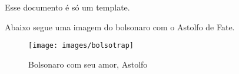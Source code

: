 \documentclass[../resumo.tex]{subfiles}
\begin{document}
	Esse documento é só um template.

	Abaixo segue uma imagem do bolsonaro com o Astolfo de Fate.

	\begin{figure}[H]
		\centering
		\texttt{[image: images/bolsotrap]}
		\caption{Bolsonaro com seu amor, Astolfo}
		\label{fig:bolsotrap}
	\end{figure}
\end{document}
